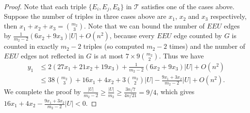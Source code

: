 \documentclass[11pt, reqno]{amsart}    	%
\theoremstyle{definition}
\def\cT{\mathcal T}
\numberwithin{equation}{section}
\begin{document}
\begin{proof}
		Note that each triple $\{E_i, E_j, E_k\}$ in $\cT$ satisfies one of the cases above.
		Suppose the number of triples in three cases above are $x_1$, $x_2$ and $x_3$ respectively, then $x_1+x_2+x_3=\binom{m_2}{3}$. 
		Note that we can bound the number of $EEU$ edges by $\frac{1}{m_2-2}(6x_2+9x_3)|U|+O(n^2)$, because every $EEU$ edge counted by $G$ is counted in exactly $m_2-2$ triples (so computed $m_2-2$ times) and the number of $EEU$ edges not reflected in $G$ is at most $ 7\times 9 \binom{m_2}{2}$.
	Thus we have
		\[\begin{split}y_{1}&\le 	2 (27x_1+21x_2+ 19x_3)+\frac{1}{m_2-2}(6x_2+9x_3)|U|+O(n^2) \\
			&\le 38\binom{m_2}{3}+16x_1+4x_2+3\binom{m_2}{2}|U|-\frac{9x_1+3x_2}{m_2-2}|U|+O(n^2).
		\end{split}\]
		We complete the proof by $\frac{|U|}{m_2-2}\ge \frac{|U|}{m_2}\ge \frac{3n/7}{4n/21}=9/4$, which gives $16x_1+4x_2-\frac{9x_1+3x_2}{m_2-2}|U|<0$.
	\end{proof}
	
\end{document}
